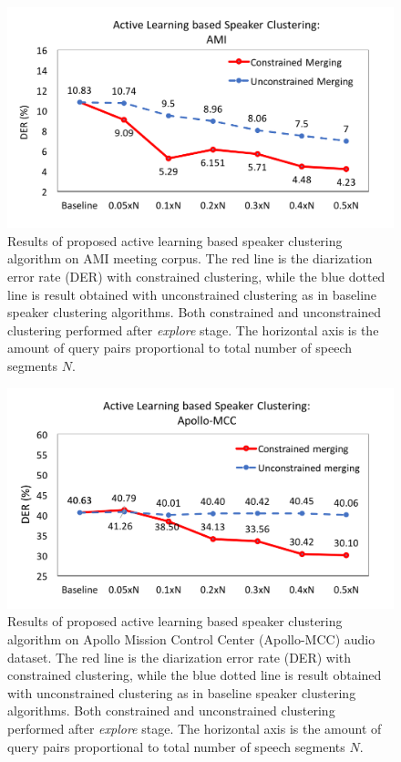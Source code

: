 \documentclass[journal,10pt]{IEEEtran}
\begin{document}
\begin{figure}[t]
	\centering
	\includegraphics[width=\linewidth]{figs/exp1_1}
	\caption{Results of proposed active learning based speaker clustering algorithm on AMI meeting corpus. The red line is the diarization error rate (DER) with constrained clustering, while the blue dotted line is result obtained with unconstrained clustering as in baseline speaker clustering algorithms. Both constrained and unconstrained clustering performed after \textit{explore} stage. The horizontal axis is the amount of query pairs proportional to total number of speech segments $N$. }
	\label{exp1_1}
\end{figure}
\begin{figure}[t]
	\includegraphics[width=\linewidth]{figs/exp1_2}
	\caption{Results of proposed active learning based speaker clustering algorithm on Apollo Mission Control Center (Apollo-MCC) audio dataset. The red line is the diarization error rate (DER) with constrained clustering, while the blue dotted line is result obtained with unconstrained clustering as in baseline speaker clustering algorithms. Both constrained and unconstrained clustering performed after \textit{explore} stage. The horizontal axis is the amount of query pairs proportional to total number of speech segments $N$.}
	\label{exp1_2}
\end{figure}
\end{document}
